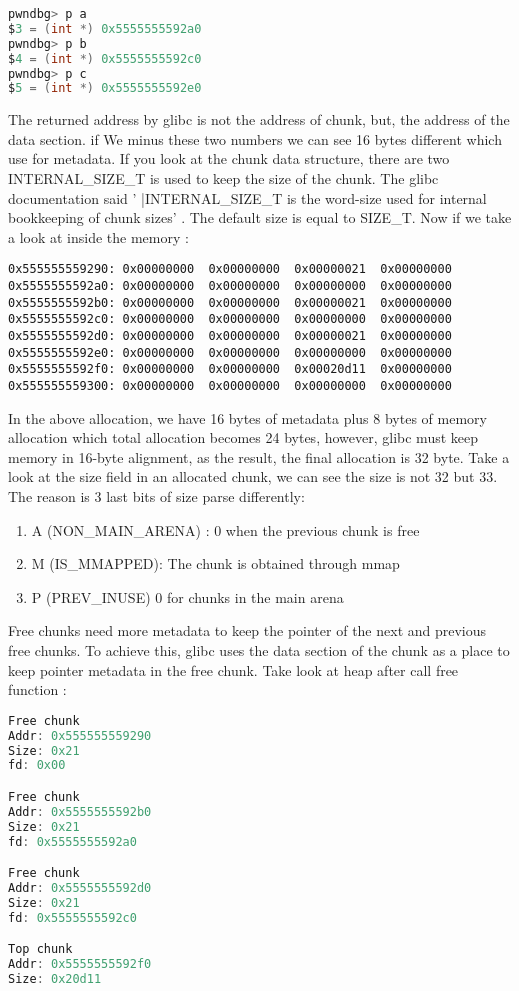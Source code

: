 \documentclass{masterthesis}
\newcommand*\sizet{SIZE\_T}
\newcommand*\libc{glibc}
\begin{document}
\begin{lstlisting}[language=c,frame=tlrb]
pwndbg> p a
$3 = (int *) 0x5555555592a0
pwndbg> p b
$4 = (int *) 0x5555555592c0
pwndbg> p c
$5 = (int *) 0x5555555592e0
\end{lstlisting}
The returned address by \libc{} is not the address of chunk, but, the address of the data section. if We minus these two numbers we can see 16 bytes different which use for metadata. If you look at the chunk data structure, there are two INTERNAL\_SIZE\_T is used to keep the size of the chunk. The \libc{} documentation said ' |INTERNAL\_SIZE\_T is the word-size used for internal bookkeeping of chunk sizes' . The default size is equal to \sizet{}. Now if we take a look at inside the memory : 
\begin{lstlisting}[frame=tlrb]
0x555555559290:	0x00000000	0x00000000	0x00000021	0x00000000
0x5555555592a0:	0x00000000	0x00000000	0x00000000	0x00000000
0x5555555592b0:	0x00000000	0x00000000	0x00000021	0x00000000
0x5555555592c0:	0x00000000	0x00000000	0x00000000	0x00000000
0x5555555592d0:	0x00000000	0x00000000	0x00000021	0x00000000
0x5555555592e0:	0x00000000	0x00000000	0x00000000	0x00000000
0x5555555592f0:	0x00000000	0x00000000	0x00020d11	0x00000000
0x555555559300:	0x00000000	0x00000000	0x00000000	0x00000000
\end{lstlisting}
In the above allocation, we have 16 bytes of metadata plus 8 bytes of memory allocation which total allocation becomes 24 bytes, however, \libc{} must keep memory in 16-byte alignment, as the result, the final allocation is 32 byte. Take a look at the size field in an allocated chunk, we can see the size is not 32 but 33. The reason is 3 last bits of size parse differently:
\begin{enumerate}
	\item A (NON\_MAIN\_ARENA) : 0 when the previous chunk is free
	\item M (IS\_MMAPPED): The chunk is obtained through mmap
	\item P (PREV\_INUSE) 0 for chunks in the main arena
\end{enumerate}
Free chunks need more metadata to keep the pointer of the next and previous free chunks. To achieve this, \libc{} uses the data section of the chunk as a place to keep pointer metadata in the free chunk. Take look at heap after call free function :
\begin{lstlisting}[language=c,frame=tlrb]
Free chunk 
Addr: 0x555555559290
Size: 0x21
fd: 0x00

Free chunk
Addr: 0x5555555592b0
Size: 0x21
fd: 0x5555555592a0

Free chunk 
Addr: 0x5555555592d0
Size: 0x21
fd: 0x5555555592c0

Top chunk
Addr: 0x5555555592f0
Size: 0x20d11
\end{lstlisting}
\end{document}
